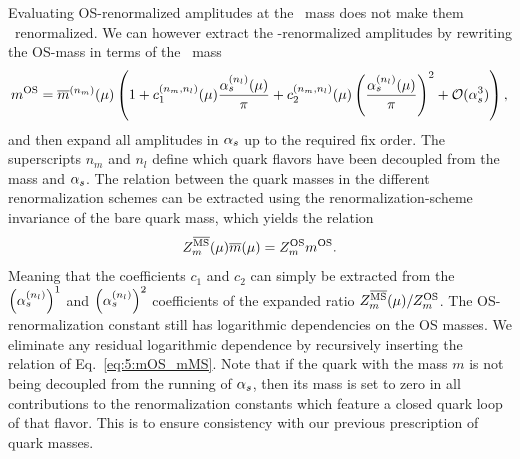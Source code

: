 Evaluating \acs{OS}-renormalized amplitudes at the \MS\ mass does not make them \MS\ renormalized. We can however extract the \MS-renormalized amplitudes by rewriting the \acs{OS}-mass in terms of the \MS\ mass
\begin{equation}
m^{\text{OS}}  = \overline{m}^{(n_m)}(\mu) \left(1 + c_1^{(n_m,n_l)} (\mu) \frac{\alpha_s^{(n_l)}(\mu)}{\pi} + c_2^{(n_m, n_l)}(\mu) \left( \frac{\alpha_s^{(n_l)}(\mu)}{\pi} \right)^2 + \mathcal{O}(\alpha_s^3)\right),
\label{eq:5:mOS_mMS}
\end{equation}
and then expand all amplitudes in $\alpha_s$ up to the required fix order. The superscripts $n_m$ and $n_l$ define which quark flavors have been decoupled from the mass and $\alpha_s$. The relation between the quark masses in the different renormalization schemes can be extracted using the renormalization-scheme invariance of the bare quark mass, which yields the relation
\begin{equation}
Z_m^{\overline{\mathrm{MS}}}(\mu) \overline{m}(\mu) = Z_m^{\text{OS}} m^{\text{OS}}.
\end{equation}
Meaning that the coefficients $c_1$ and $c_2$ can simply be extracted from the $\left(\alpha_s^{(n_l)} \right)^1$ and $\left(\alpha_s^{(n_l)}\right)^2$ coefficients of the expanded ratio $Z_m^{\overline{\mathrm{MS}}}(\mu)/Z_m^{\text{OS}}$. The \acs{OS}-renormalization constant still has logarithmic dependencies on the \acs{OS} masses. We eliminate any residual logarithmic dependence by recursively inserting the relation of Eq.~\eqref{eq:5:mOS_mMS}. Note that if the quark with the mass $m$ is not being decoupled from the running of $\alpha_s$, then its mass is set to zero in all contributions to the renormalization constants which feature a closed quark loop of that flavor. This is to ensure consistency with our previous prescription of quark masses.

